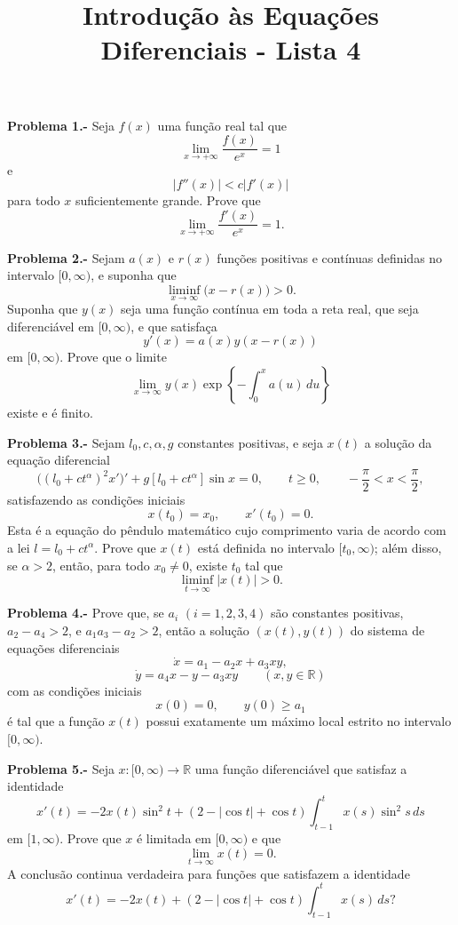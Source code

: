 \documentclass[10pt,a4paper]{amsart}
\title{Introdução às Equações Diferenciais - Lista 4}
\begin{document}
\maketitle





\textbf{Problema 1.-} Seja \(f(x)\) uma função real tal que
\[
\lim_{x\to +\infty} \frac{f(x)}{e^x}=1
\]
e
\[
|f''(x)|<c|f'(x)|
\]
para todo \(x\) suficientemente grande. Prove que
\[
\lim_{x\to +\infty} \frac{f'(x)}{e^x}=1.
\]

\vspace{5mm}

\textbf{Problema 2.-} Sejam \(a(x)\) e \(r(x)\) funções positivas e contínuas definidas no intervalo
\([0,\infty)\), e suponha que
\[
\liminf_{x\to\infty} \bigl(x-r(x)\bigr)>0.
\]
Suponha que \(y(x)\) seja uma função contínua em toda a reta real, que seja
diferenciável em \([0,\infty)\), e que satisfaça
\[
y'(x)=a(x)y(x-r(x))
\]
em \([0,\infty)\). Prove que o limite
\[
\lim_{x\to\infty} y(x)\exp\left\{-\int_0^x a(u)\,du\right\}
\]
existe e é finito.

\vspace{5mm}

\textbf{Problema 3.-} Sejam \(l_0,c,\alpha,g\) constantes positivas, e seja \(x(t)\) a solução da
equação diferencial
\[
\bigl((l_0+ct^\alpha)^2x'\bigr)'
+g[l_0+ct^\alpha]\sin x=0,
\qquad t\geq 0,\qquad -\frac{\pi}{2}<x<\frac{\pi}{2},
\]
satisfazendo as condições iniciais
\[
x(t_0)=x_0,\qquad x'(t_0)=0.
\]
Esta é a equação do pêndulo matemático cujo comprimento varia de acordo
com a lei \(l=l_0+ct^\alpha\). Prove que \(x(t)\) está definida no intervalo
\([t_0,\infty)\); além disso, se \(\alpha>2\), então, para todo \(x_0\neq 0\),
existe \(t_0\) tal que
\[
\liminf_{t\to\infty}|x(t)|>0.
\]

\vspace{5mm}

\textbf{Problema 4.-} Prove que, se \(a_i\) \((i=1,2,3,4)\) são constantes positivas,
\(a_2-a_4>2\), e \(a_1a_3-a_2>2\), então a solução
\((x(t),y(t))\) do sistema de equações diferenciais
\[
\dot{x}=a_1-a_2x+a_3xy,
\]
\[
\dot{y}=a_4x-y-a_3xy
\qquad (x,y\in\mathbb{R})
\]
com as condições iniciais
\[
x(0)=0,\qquad y(0)\geq a_1
\]
é tal que a função \(x(t)\) possui exatamente um máximo local estrito
no intervalo \([0,\infty)\).

\vspace{5mm}

\textbf{Problema 5.-} Seja \(x:[0,\infty)\to\mathbb{R}\) uma função diferenciável que satisfaz a identidade
\[
x'(t)
=
-2x(t)\sin^2 t
+
(2-|\cos t|+\cos t)
\int_{t-1}^{t} x(s)\sin^2 s\,ds
\]
em \([1,\infty)\). Prove que \(x\) é limitada em \([0,\infty)\) e que
\[
\lim_{t\to\infty}x(t)=0.
\]
A conclusão continua verdadeira para funções que satisfazem a identidade
\[
x'(t)
=
-2x(t)
+
(2-|\cos t|+\cos t)
\int_{t-1}^{t}x(s)\,ds?
\]
\end{document}
